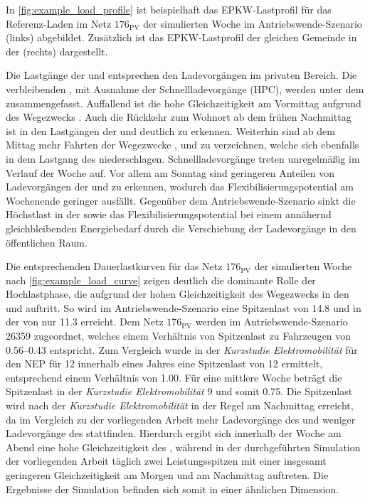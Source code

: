 

In \autoref{fig:example_load_profile} ist beispielhaft das \gls{EPKW}-Lastprofil für das Referenz-Laden im Netz \(176_{\text{PV}}\) der simulierten Woche im Antriebswende-Szenario (links) abgebildet.
Zusätzlich ist das \gls{EPKW}-Lastprofil der gleichen Gemeinde in der \SzeFirmenparkplatz (rechts) dargestellt.



Die Lastgänge der \UCs \zH und \Firmeparkplatz entsprechen den Ladevorgängen im privaten Bereich.
Die verbleibenden \UCsdot, mit Ausnahme der Schnellladevorgänge (\gls{HPC}), werden unter dem \UC \oeffen zusammengefasst.
Auffallend ist die hohe Gleichzeitigkeit am Vormittag aufgrund des Wegezwecks \Arbeitdot.
Auch die Rückkehr zum Wohnort ab dem frühen Nachmittag ist in den Lastgängen der \UCs \zH und \oeffen deutlich zu erkennen.
Weiterhin sind ab dem Mittag mehr Fahrten der Wegezwecke \Einkaufdot, \Erledigung und \Freizeit zu verzeichnen, welche sich ebenfalls in dem Lastgang des \UC \oeffen niederschlagen.
Schnellladevorgänge treten unregelmäßig im Verlauf der Woche auf.
Vor allem am Sonntag sind geringeren Anteilen von Ladevorgängen der \UCs \zH und \Firmeparkplatz zu erkennen, wodurch das Flexibilisierungspotential am Wochenende geringer ausfällt.
Gegenüber dem Antriebswende-Szenario sinkt die Höchstlast in der \SzeFirmenparkplatz sowie das Flexibilisierungspotential bei einem annähernd gleichbleibenden Energiebedarf durch die Verschiebung der Ladevorgänge in den öffentlichen Raum.\medskip

Die entsprechenden Dauerlastkurven für das Netz \(176_{\text{PV}}\) der simulierten Woche nach \autoref{fig:example_load_curve} zeigen deutlich die dominante Rolle der Hochlastphase, die aufgrund der hohen Gleichzeitigkeit des Wegezwecks \Arbeit in den \UCs \Firmeparkplatz und \Straszenrand auftritt.
So wird im Antriebswende-Szenario eine Spitzenlast von \SI{14.8}{\mw} und in der \SzeFirmenparkplatz von nur \SI{11.3}{\mw} erreicht.
Dem Netz \(176_{\text{PV}}\) werden im Antriebswende-Szenario \SI{26359}{\FZ} zugeordnet, welches einem Verhältnis von Spitzenlast zu Fahrzeugen von \SIrange[range-phrase=~bzw.~]{0.56}{0.43}{\kWperFZ} entspricht.
Zum Vergleich wurde in der \textit{Kurzstudie Elektromobilität} für den \gls{NEP} \cite{Ebner2019} für \SI{12}{\MioStk} innerhalb eines Jahres eine Spitzenlast von \SI{12}{\gw} ermittelt, entsprechend einem Verhältnis von \SI{1.00}{\kWperFZ}.
Für eine mittlere Woche beträgt die Spitzenlast in der \textit{Kurzstudie Elektromobilität} \SI{9}{\gw} und somit \SI{0.75}{\kWperFZ}.
Die Spitzenlast wird nach der \textit{Kurzstudie Elektromobilität} in der Regel am Nachmittag erreicht, da im Vergleich zu der vorliegenden Arbeit mehr Ladevorgänge des \UC \zH und weniger Ladevorgänge des \UC \Firmeparkplatz stattfinden.
Hierdurch ergibt sich innerhalb der Woche am Abend eine hohe Gleichzeitigkeit des \UC \zHdot, während in der durchgeführten Simulation der vorliegenden Arbeit täglich zwei Leistungsspitzen mit einer insgesamt geringeren Gleichzeitigkeit am Morgen und am Nachmittag auftreten.
Die Ergebnisse der Simulation befinden sich somit in einer ähnlichen Dimension.

